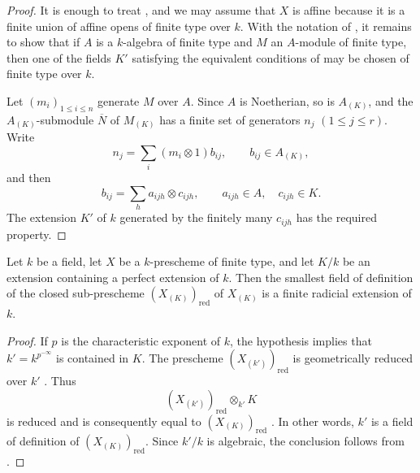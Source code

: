 \begin{proof}
It is enough to treat , and we may assume that $X$ is
affine because it is a finite union of affine opens of finite type
over $k$.
With the notation of , it remains to show that if $A$
is a $k$-algebra of finite type and $M$ an $A$-module of finite type,
then one of the fields $K'$ satisfying the equivalent conditions of
 may be chosen of finite type over $k$.

Let $(m_i)_{1\le i\le n}$ generate $M$ over $A$.
Since $A$ is Noetherian, so is $A_{(K)}$, and the
$A_{(K)}$-submodule $\overline N$ of $M_{(K)}$ has a finite set of
generators $n_j$ $(1\le j\le r)$.
Write
\[
n_j=\sum_i(m_i\otimes1)b_{ij},
\qquad b_{ij}\in A_{(K)},
\]
and then
\[
b_{ij}=\sum_h a_{ijh}\otimes c_{ijh},
\qquad a_{ijh}\in A,\quad c_{ijh}\in K.
\]
The extension $K'$ of $k$ generated by the finitely many
$c_{ijh}$ has the required property.
\end{proof}

\begin{proposition}[4.8.14]
\label{IV.4.8.14}
Let $k$ be a field, let $X$ be a $k$-prescheme of finite type, and
let $K/k$ be an extension containing a perfect extension of $k$.
Then the smallest field of definition of the closed sub-prescheme
$(X_{(K)})_{\mathrm{red}}$ of $X_{(K)}$ is a finite radicial
extension of $k$.
\end{proposition}

\begin{proof}
If $p$ is the characteristic exponent of $k$, the hypothesis implies
that $k'=k^{p^{-\infty}}$ is contained in $K$.
The prescheme $(X_{(k')})_{\mathrm{red}}$ is geometrically reduced
over $k'$ .
Thus
\[
(X_{(k')})_{\mathrm{red}}\otimes_{k'}K
\]
is reduced and is consequently equal to
$(X_{(K)})_{\mathrm{red}}$ .
In other words, $k'$ is a field of definition of
$(X_{(K)})_{\mathrm{red}}$.
Since $k'/k$ is algebraic, the conclusion follows from
.
\end{proof}

